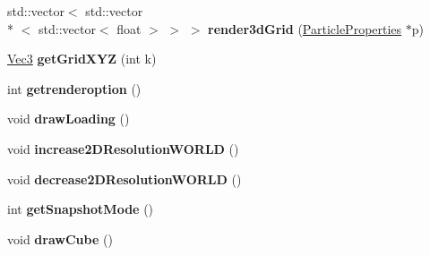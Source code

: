 \begin{DoxyCompactItemize}
\item 
\hypertarget{classWorld_a119745daabbf33b5eea16f6c1fa13539}{std\-::vector$<$ std\-::vector\\*
$<$ std\-::vector$<$ float $>$ $>$ $>$ {\bfseries render3d\-Grid} (\hyperlink{classParticleProperties}{Particle\-Properties} $\ast$p)}\label{classWorld_a119745daabbf33b5eea16f6c1fa13539}

\item 
\hypertarget{classWorld_a79bfda3d3ee02e561f37fa3ef65e72ff}{\hyperlink{classVec3}{Vec3} {\bfseries get\-Grid\-X\-Y\-Z} (int k)}\label{classWorld_a79bfda3d3ee02e561f37fa3ef65e72ff}

\item 
\hypertarget{classWorld_a1a2aab6852fd79ee5d661ee45e2c3b7a}{int {\bfseries getrenderoption} ()}\label{classWorld_a1a2aab6852fd79ee5d661ee45e2c3b7a}

\item 
\hypertarget{classWorld_acdaeb9fef04e92b52562b630475e1553}{void {\bfseries draw\-Loading} ()}\label{classWorld_acdaeb9fef04e92b52562b630475e1553}

\item 
\hypertarget{classWorld_a557bf718ffb5976ae4a35daf526b6bbb}{void {\bfseries increase2\-D\-Resolution\-W\-O\-R\-L\-D} ()}\label{classWorld_a557bf718ffb5976ae4a35daf526b6bbb}

\item 
\hypertarget{classWorld_a7c0c14a57f64e4e3ffd5a5ef9f5c8156}{void {\bfseries decrease2\-D\-Resolution\-W\-O\-R\-L\-D} ()}\label{classWorld_a7c0c14a57f64e4e3ffd5a5ef9f5c8156}

\item 
\hypertarget{classWorld_a1d31371f414e6b21e584873aed9ccc22}{int {\bfseries get\-Snapshot\-Mode} ()}\label{classWorld_a1d31371f414e6b21e584873aed9ccc22}

\item 
\hypertarget{classWorld_ab035312321b021858d62e8235f8b9e02}{void {\bfseries draw\-Cube} ()}\label{classWorld_ab035312321b021858d62e8235f8b9e02}

\end{DoxyCompactItemize}
